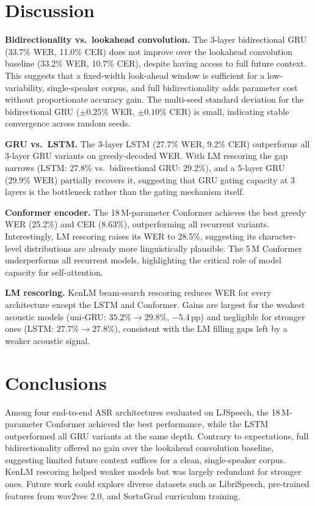 \documentclass{article}
\begin{document}
\section{Discussion}

\textbf{Bidirectionality vs.\ lookahead convolution.}
The 3-layer bidirectional GRU (33.7\% WER, 11.0\% CER) does not improve over the lookahead convolution baseline (33.2\% WER, 10.7\% CER), despite having access to full future context. This suggests that a fixed-width look-ahead window is sufficient for a low-variability, single-speaker corpus, and full bidirectionality adds parameter cost without proportionate accuracy gain. The multi-seed standard deviation for the bidirectional GRU ($\pm 0.25\%$ WER, $\pm 0.10\%$ CER) is small, indicating stable convergence across random seeds.

\textbf{GRU vs.\ LSTM.}
The 3-layer LSTM (27.7\% WER, 9.2\% CER) outperforms all 3-layer GRU variants on greedy-decoded WER. With LM rescoring the gap narrows (LSTM: 27.8\% vs.\ bidirectional GRU: 29.2\%), and a 5-layer GRU (29.9\% WER) partially recovers it, suggesting that GRU gating capacity at 3 layers is the bottleneck rather than the gating mechanism itself.

\textbf{Conformer encoder.}
The 18\,M-parameter Conformer achieves the best greedy WER (25.2\%) and CER (8.63\%), outperforming all recurrent variants. Interestingly, LM rescoring raises its WER to 28.5\%, suggesting its character-level distributions are already more linguistically plausible. The 5\,M Conformer underperforms all recurrent models, highlighting the critical role of model capacity for self-attention.

\textbf{LM rescoring.}
KenLM beam-search rescoring reduces WER for every architecture except the LSTM and Conformer. Gains are largest for the weakest acoustic models (uni-GRU: $35.2\% \to 29.8\%$, $-5.4$\,pp) and negligible for stronger ones (LSTM: $27.7\% \to 27.8\%$), consistent with the LM filling gaps left by a weaker acoustic signal.


\section{Conclusions}

Among four end-to-end ASR architectures evaluated on LJSpeech, the 18\,M-parameter Conformer achieved the best performance, while the LSTM outperformed all GRU variants at the same depth. Contrary to expectations, full bidirectionality offered no gain over the lookahead convolution baseline, suggesting limited future context suffices for a clean, single-speaker corpus. KenLM rescoring helped weaker models but was largely redundant for stronger ones. Future work could explore diverse datasets such as LibriSpeech, pre-trained features from wav2vec 2.0, and SortaGrad curriculum training.
\end{document}

